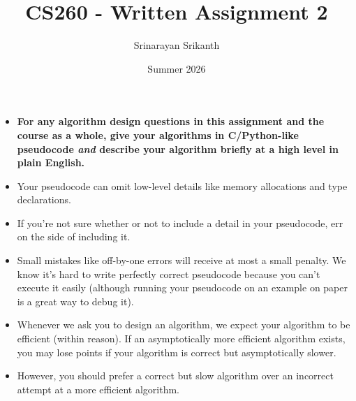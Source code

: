 \documentclass[addpoints]{exam}
\begin{document}
\title{CS260 - Written Assignment 2}
\author{Srinarayan Srikanth}
\date{Summer 2026}
\maketitle



\newcommand{\limn}{\lim_{n \to \infty}}

\begin{itemize}
\item {\color{red} \textbf{For any algorithm design questions in this assignment and the course as a whole, give your algorithms in C/Python-like pseudocode \textit{and} describe your algorithm briefly at a high level in plain English.}}
\item Your pseudocode can omit low-level details like memory allocations and type declarations.
\item If you're not sure whether or not to include a detail in your pseudocode, err on the side of including it.
\item Small mistakes like off-by-one errors will receive at most a small penalty. We know it's hard to write perfectly correct pseudocode because you can't execute it easily (although running your pseudocode on an example on paper is a great way to debug it).
\item Whenever we ask you to design an algorithm, we expect your algorithm to be efficient (within reason). If an asymptotically more efficient algorithm exists, you may lose points if your algorithm is correct but asymptotically slower.
\item However, you should prefer a correct but slow algorithm over an incorrect attempt at a more efficient algorithm.
\end{itemize}
\end{document}
